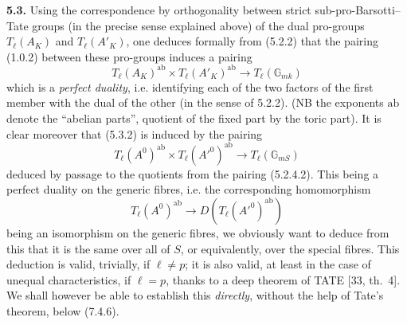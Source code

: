 \documentclass[11pt]{article}
\newcommand{\GG}{\mathbb G}
\newcommand{\Tl}{T_{\ell}}
\newcommand{\ab}{\mathrm{ab}}
\begin{document}
\noindent\textbf{5.3.} Using the correspondence by orthogonality between
strict sub-pro-Barsotti--Tate groups (in the precise sense explained
above) of the dual pro-groups $\Tl(A_K)$ and $\Tl(A'_K)$, one deduces
formally from (5.2.2) that the pairing (1.0.2) between these pro-groups
induces a pairing
\begin{equation}
\Tl(A_K)^{\ab} \times \Tl(A'_K)^{\ab} \longrightarrow
\Tl(\GG_{mk})
\end{equation}
which is a \emph{perfect duality}, i.e. identifying each of the two
factors of the first member with the dual of the other (in the sense of
5.2.2). (NB the exponents $\ab$ denote the ``abelian parts'', quotient
of the fixed part by the toric part). It is clear moreover that (5.3.2)
is induced by the pairing
\begin{equation}
\Tl(A^0)^{\ab} \times \Tl(A'^0)^{\ab} \longrightarrow
\Tl(\GG_{mS})
\end{equation}
deduced by passage to the quotients from the pairing (5.2.4.2). This
being a perfect duality on the generic fibres, i.e. the corresponding
homomorphism
\begin{equation}
\Tl(A^0)^{\ab} \longrightarrow D(\Tl(A'^0)^{\ab})
\end{equation}
being an isomorphism on the generic fibres, we obviously want to deduce
from this that it is the same over all of $S$, or equivalently, over
the special fibres. This deduction is valid, trivially, if $\ell \neq p$;
it is also valid, at least in the case of unequal characteristics, if
$\ell = p$, thanks to a deep theorem of TATE [33, th.~4]. We shall
however be able to establish this \emph{directly}, without the help of
Tate's theorem, below (7.4.6).
\end{document}
